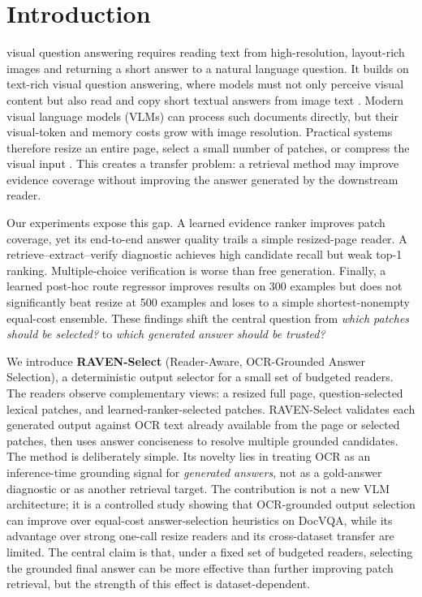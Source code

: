 \documentclass[journal]{IEEEtran}
\begin{document}
\section{Introduction}
 visual question answering requires reading text from
high-resolution, layout-rich images and returning a short answer to a natural
language question.  It builds on text-rich visual question answering, where
models must not only perceive visual content but also read and copy short
textual answers from image text \cite{docvqa,textvqa,m4c}.  Modern visual
language models (VLMs) can process such documents directly, but their
visual-token and memory costs grow with image resolution.  Practical systems
therefore resize an entire page, select a small number of patches, or compress
the visual input \cite{qwen25vl,llavauhd,fastvlm,ureader,docowl2,docvlm}.
This creates a transfer problem: a retrieval method may improve evidence
coverage without improving the answer generated by the downstream reader.

Our experiments expose this gap.  A learned evidence ranker improves patch
coverage, yet its end-to-end answer quality trails a simple resized-page reader.
A retrieve--extract--verify diagnostic achieves high candidate recall but weak
top-1 ranking.  Multiple-choice verification is worse than free generation.
Finally, a learned post-hoc route regressor improves results on 300 examples but
does not significantly beat resize at 500 examples and loses to a simple
shortest-nonempty equal-cost ensemble.  These findings shift the central
question from \emph{which patches should be selected?} to \emph{which generated
answer should be trusted?}

We introduce \textbf{RAVEN-Select} (Reader-Aware, OCR-Grounded Answer
Selection), a deterministic output selector for a small set of budgeted
readers.  The readers observe complementary views: a resized full page,
question-selected lexical patches, and learned-ranker-selected patches.
RAVEN-Select validates each generated output against OCR text already available
from the page or selected patches, then uses answer conciseness to resolve
multiple grounded candidates.  The method is deliberately simple.  Its novelty
lies in treating OCR as an inference-time grounding signal for \emph{generated
answers}, not as a gold-answer diagnostic or as another retrieval target.  The
contribution is not a new VLM architecture; it is a controlled study showing
that OCR-grounded output selection can improve over equal-cost answer-selection
heuristics on DocVQA, while its advantage over strong one-call resize readers
and its cross-dataset transfer are limited.
The central claim is that, under a fixed set of budgeted readers, selecting the
grounded final answer can be more effective than further improving patch
retrieval, but the strength of this effect is dataset-dependent.
\end{document}
